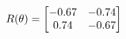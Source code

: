 \documentclass[preview]{standalone}
\begin{document}
\begin{align*}
\special{dvisvgm:raw <g id='unique000'>}R(\theta) = \begin{bmatrix}-0.67 & -0.74\\0.74 & -0.67\end{bmatrix}\special{dvisvgm:raw </g>}
\end{align*}
\end{document}
